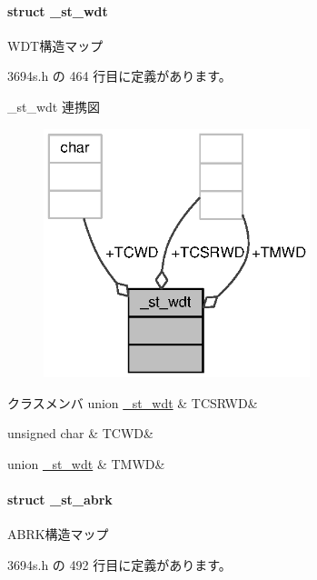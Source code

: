 \paragraph{struct \+\_\+st\+\_\+wdt}
W\+D\+T構造マップ 

 3694s.\+h の 464 行目に定義があります。



\+\_\+st\+\_\+wdt 連携図
\nopagebreak
\begin{figure}[H]
\begin{center}
\leavevmode
\includegraphics[width=220pt]{d7/d0a/struct__st__wdt__coll__graph}
\end{center}
\end{figure}
\begin{DoxyFields}{クラスメンバ}
union \hyperlink{3694s_8h_d5/d6e/union__st__wdt_8TCSRWD}{\+\_\+st\+\_\+wdt}\label{3694s_8h_a103b848c61d494840d290f6c31ea8dbc}
&
T\+C\+S\+R\+W\+D&
\\
\hline

unsigned char\label{3694s_8h_a0fbea303efa0c690aab0ecde27e3d84e}
&
T\+C\+W\+D&
\\
\hline

union \hyperlink{3694s_8h_d1/d88/union__st__wdt_8TMWD}{\+\_\+st\+\_\+wdt}\label{3694s_8h_aaa1f39950512e4660f3caa64820a99a5}
&
T\+M\+W\+D&
\\
\hline

\end{DoxyFields}
\label{struct__st__abrk}
\paragraph{struct \+\_\+st\+\_\+abrk}
A\+B\+R\+K構造マップ 

 3694s.\+h の 492 行目に定義があります。



